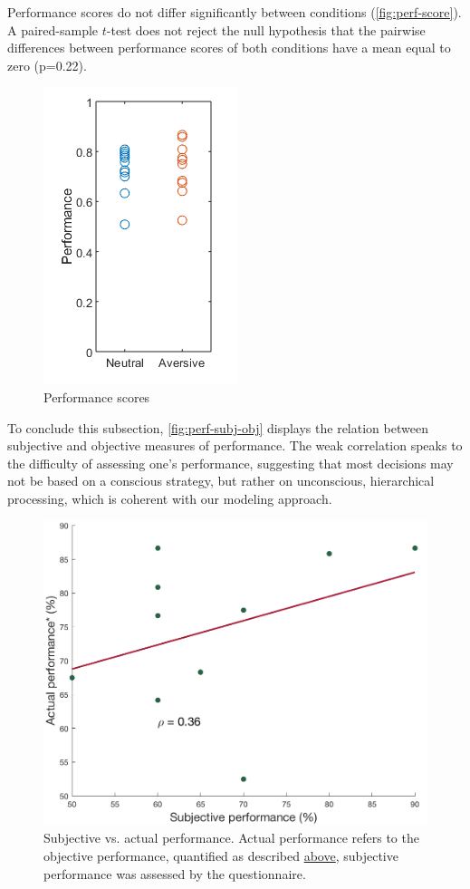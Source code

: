 \documentclass{article}
\begin{document}
\begin{multicols}{2}
Performance scores do not differ significantly between conditions (\autoref{fig:perf-score}). A paired-sample $t$-test does not reject the null hypothesis that the pairwise differences between performance scores of both conditions have a mean equal to zero (p=0.22). 

\begin{figure}[H]
  \centering
  \includegraphics[width=.25\textwidth]{Performanceprofile.png}
  \caption{Performance scores}
  \label{fig:perf-score}
\end{figure}
To conclude this subsection, \autoref{fig:perf-subj-obj} displays the relation between subjective and objective measures of performance. The weak correlation speaks to the difficulty of assessing one's performance, suggesting that most decisions may not be based on a conscious strategy, but rather on unconscious, hierarchical processing, which is coherent with our modeling approach.  %
\\
\vfill\null
\columnbreak

\begin{figure}[H]
  \centering
  \includegraphics[width=.48\textwidth]{perf_subj_obj.png}
  \caption{Subjective vs. actual performance. Actual performance refers to the objective performance, quantified as described \hyperref[sec:ass]{above}, subjective performance was assessed by the questionnaire.}
  \label{fig:perf-subj-obj}
\end{figure}


\end{multicols}
\end{document}
